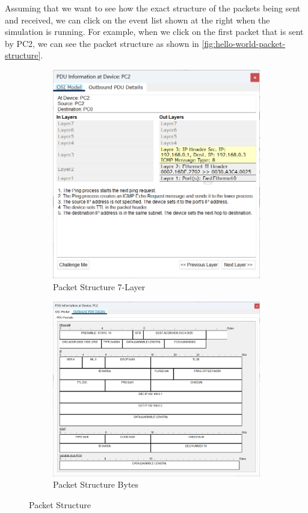 Assuming that we want to see how the exact structure of the packets being sent
and received, we can click on the event list shown at the right when the
simulation is running. For example, when we click on the first packet that is
sent by PC2, we can see the packet structure as shown in
\autoref{fig:hello-world-packet-structure}.

\begin{figure}
    \centering
    \begin{subfigure}[b]{0.48\textwidth}
        \centering
        \includegraphics[width=\linewidth]{images/hello-world-packet-structure-1.png}
        \caption{Packet Structure 7-Layer}
    \end{subfigure}
    \begin{subfigure}[b]{0.48\textwidth}
        \centering
        \includegraphics[width=\linewidth]{images/hello-world-packet-structure-2.png}
        \caption{Packet Structure Bytes}
    \end{subfigure}
    \caption{Packet Structure}\label{fig:hello-world-packet-structure}
\end{figure}
